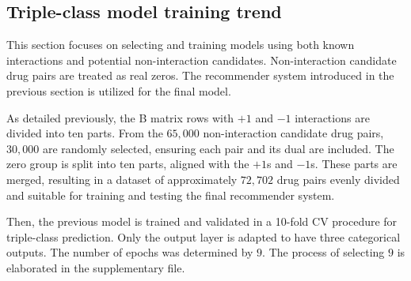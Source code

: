 \documentclass[unnumsec,webpdf,contemporary,large]{oup-authoring-template}%
\theoremstyle{thmstyleone}%
\theoremstyle{thmstyletwo}%
\theoremstyle{thmstylethree}%
\begin{document}
\subsection{Triple-class model training trend}\label{subsec2}
This section focuses on selecting and training models using both known interactions and potential non-interaction candidates. Non-interaction candidate drug pairs are treated as real zeros. The recommender system introduced in the previous section is utilized for the final model.

As detailed previously, the B matrix rows with $+1$ and $-1$ interactions are divided into ten parts. From the $65,000$ non-interaction candidate drug pairs, $30,000$ are randomly selected, ensuring each pair and its dual are included. The zero group is split into ten parts, aligned with the $+1$s and $-1$s. These parts are merged, resulting in a dataset of approximately $72,702$ drug pairs evenly divided and suitable for training and testing the final recommender system.

Then, the previous model is trained and validated in a 10-fold CV procedure for triple-class prediction. Only the output layer is adapted to have three categorical outputs. The number of epochs was determined by $9$. The process of selecting $9$ is elaborated in the supplementary file.
\end{document}
